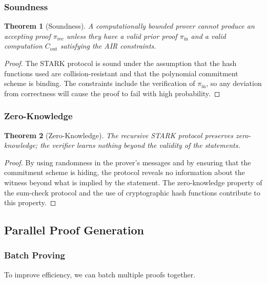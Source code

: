 \documentclass{article}
\theoremstyle{plain}
\newtheorem{theorem}{Theorem}[section]
\theoremstyle{definition}
\theoremstyle{remark}
\theoremstyle{problem}
\begin{document}
\subsubsection{Soundness}

\begin{theorem}[Soundness]
A computationally bounded prover cannot produce an accepting proof $\pi_{\text{rec}}$ unless they have a valid prior proof $\pi_{\text{in}}$ and a valid computation $C_{\text{out}}$ satisfying the AIR constraints.
\end{theorem}

\begin{proof}
The STARK protocol is sound under the assumption that the hash functions used are collision-resistant and that the polynomial commitment scheme is binding. The constraints include the verification of $\pi_{\text{in}}$, so any deviation from correctness will cause the proof to fail with high probability.
\end{proof}

\subsubsection{Zero-Knowledge}

\begin{theorem}[Zero-Knowledge]
The recursive STARK protocol preserves zero-knowledge; the verifier learns nothing beyond the validity of the statements.
\end{theorem}

\begin{proof}
By using randomness in the prover's messages and by ensuring that the commitment scheme is hiding, the protocol reveals no information about the witness beyond what is implied by the statement. The zero-knowledge property of the sum-check protocol and the use of cryptographic hash functions contribute to this property.
\end{proof}

\subsection{Parallel Proof Generation}

\subsubsection{Batch Proving}

To improve efficiency, we can batch multiple proofs together.
\end{document}
